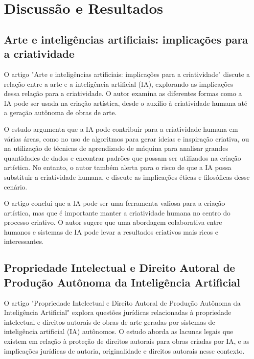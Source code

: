 \documentclass[12pt]{article}
\begin{document}
	\section{Discussão e Resultados}
	\label{sec:trab_relacionados}

    \subsection{Arte e inteligências artificiais: implicações para a criatividade}
	\label{sec:trab_relacionados}
	
	O artigo "Arte e inteligências artificiais: implicações para a criatividade" discute a relação entre a arte e a inteligência artificial (IA), explorando as implicações dessa relação para a criatividade. O autor examina as diferentes formas como a IA pode ser usada na criação artística, desde o auxílio à criatividade humana até a geração autônoma de obras de arte.
    
    O estudo argumenta que a IA pode contribuir para a criatividade humana em várias áreas, como no uso de algoritmos para gerar ideias e inspiração criativa, ou na utilização de técnicas de aprendizado de máquina para analisar grandes quantidades de dados e encontrar padrões que possam ser utilizados na criação artística. No entanto, o autor também alerta para o risco de que a IA possa substituir a criatividade humana, e discute as implicações éticas e filosóficas desse cenário.
    
    O artigo conclui que a IA pode ser uma ferramenta valiosa para a criação artística, mas que é importante manter a criatividade humana no centro do processo criativo. O autor sugere que uma abordagem colaborativa entre humanos e sistemas de IA pode levar a resultados criativos mais ricos e interessantes.

    \subsection{Propriedade Intelectual e Direito Autoral de Produção Autônoma da Inteligência Artificial}
	\label{sec:trab_relacionados}

    O artigo "Propriedade Intelectual e Direito Autoral de Produção Autônoma da Inteligência Artificial" explora questões jurídicas relacionadas à propriedade intelectual e direitos autorais de obras de arte geradas por sistemas de inteligência artificial (IA) autônomos. O estudo aborda as lacunas legais que existem em relação à proteção de direitos autorais para obras criadas por IA, e as implicações jurídicas de autoria, originalidade e direitos autorais nesse contexto.
    
\end{document}
